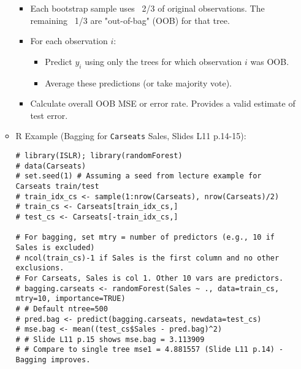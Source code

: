 \documentclass[12pt,a4paper]{article}
\newcommand{\Robject}[1]{\texttt{#1}} %
\begin{document}
\begin{itemize}
\begin{itemize}
\begin{itemize}
                    \item Each bootstrap sample uses ~2/3 of original observations. The remaining ~1/3 are "out-of-bag" (OOB) for that tree.
                    \item For each observation $i$:
                        \begin{itemize}
                            \item Predict $y_i$ using only the trees for which observation $i$ was OOB.
                            \item Average these predictions (or take majority vote).
                        \end{itemize}
                    \item Calculate overall OOB MSE or error rate. Provides a valid estimate of test error.
                \end{itemize}
            \item R Example (Bagging for \Robject{Carseats} Sales, Slides L11 p.14-15):
\begin{lstlisting}[caption={Bagging with randomForest Package (Slide L11 p.15)}]
# library(ISLR); library(randomForest)
# data(Carseats)
# set.seed(1) # Assuming a seed from lecture example for Carseats train/test
# train_idx_cs <- sample(1:nrow(Carseats), nrow(Carseats)/2)
# train_cs <- Carseats[train_idx_cs,]
# test_cs <- Carseats[-train_idx_cs,]

# For bagging, set mtry = number of predictors (e.g., 10 if Sales is excluded)
# ncol(train_cs)-1 if Sales is the first column and no other exclusions.
# For Carseats, Sales is col 1. Other 10 vars are predictors.
# bagging.carseats <- randomForest(Sales ~ ., data=train_cs, mtry=10, importance=TRUE)
# # Default ntree=500
# pred.bag <- predict(bagging.carseats, newdata=test_cs)
# mse.bag <- mean((test_cs$Sales - pred.bag)^2) 
# # Slide L11 p.15 shows mse.bag = 3.113909
# # Compare to single tree mse1 = 4.881557 (Slide L11 p.14) - Bagging improves.
\end{lstlisting}
        \end{itemize}


\end{itemize}
\end{document}
